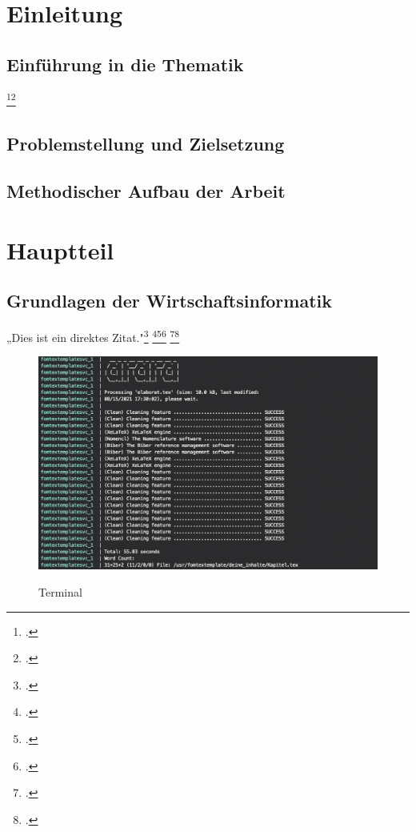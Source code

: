 \section{Einleitung}
\subsection{Einführung in die Thematik}
\blindtext{}
\blindtext\footcite[Vgl. ][]{mswpf}\footcite[Vgl. ][19]{sadtler_rechtskonformes_2017}

\subsection{Problemstellung und Zielsetzung}
\blindtext

\subsection{Methodischer Aufbau der Arbeit}
\blindtext

\section{Hauptteil}
\subsection{Grundlagen der Wirtschaftsinformatik}
„Dies ist ein direktes Zitat."\footcite[][224]{mertens_digitalisierung_2017} \blindtext\footcite[Vgl. ][]{msdatabind}\footcite[Vgl. ][]{lambda}\footcite[Vgl. ][34]{Digitaloekonomie}
\blindenumerate
\blindtext\footcite[Vgl. ][415-426]{Tanenbaum2016}\footcite[Vgl. ][223]{mandl_internet_2019}

\begin{figure}[!htb]
    \caption{Terminal}
    \includegraphics[width=1\textwidth]{.github/terminal}
    \captionsetup{width=1\textwidth}
    \label{abb_bsp}
\end{figure}
\blindtext

